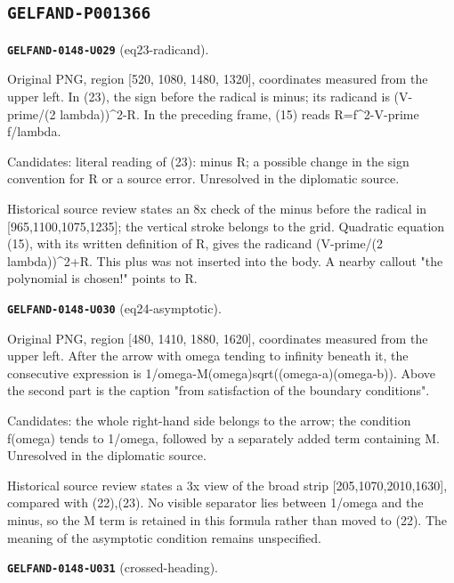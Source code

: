 \documentclass[11pt]{article}
\theoremstyle{definition}
\theoremstyle{remark}
\begin{document}
\subsection*{\texttt{GELFAND-P001366}}
\noindent\leavevmode{}\label{GELFAND-P001366:eq23-radicand:note}\textbf{\texttt{GELFAND-0148-U029}} (eq23-radicand).\par\nopagebreak[4]
Original PNG, region [520, 1080, 1480, 1320], coordinates measured from the upper left. In (23), the sign before the radical is minus; its radicand is (V-prime/(2 lambda))\textasciicircum{}2-R. In the preceding frame, (15) reads R=f\textasciicircum{}2-V-prime f/lambda.\par
Candidates: literal reading of (23): minus R; a possible change in the sign convention for R or a source error. Unresolved in the diplomatic source.\par
Historical source review states an 8x check of the minus before the radical in [965,1100,1075,1235]; the vertical stroke belongs to the grid. Quadratic equation (15), with its written definition of R, gives the radicand (V-prime/(2 lambda))\textasciicircum{}2+R. This plus was not inserted into the body. A nearby callout "the polynomial is chosen!" points to R.\par\medskip
\noindent\leavevmode{}\label{GELFAND-P001366:eq24-asymptotic:note}\textbf{\texttt{GELFAND-0148-U030}} (eq24-asymptotic).\par\nopagebreak[4]
Original PNG, region [480, 1410, 1880, 1620], coordinates measured from the upper left. After the arrow with omega tending to infinity beneath it, the consecutive expression is 1/omega-M(omega)sqrt((omega-a)(omega-b)). Above the second part is the caption "from satisfaction of the boundary conditions".\par
Candidates: the whole right-hand side belongs to the arrow; the condition f(omega) tends to 1/omega, followed by a separately added term containing M. Unresolved in the diplomatic source.\par
Historical source review states a 3x view of the broad strip [205,1070,2010,1630], compared with (22),(23). No visible separator lies between 1/omega and the minus, so the M term is retained in this formula rather than moved to (22). The meaning of the asymptotic condition remains unspecified.\par\medskip
\noindent\leavevmode{}\label{GELFAND-P001366:crossed-heading:note}\textbf{\texttt{GELFAND-0148-U031}} (crossed-heading).\par\nopagebreak[4]
\end{document}

